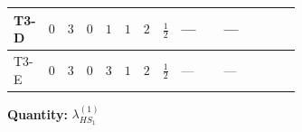 \documentclass[8pt]{article}
\begin{document}
\begin{landscape}
\begin{longtable}{@{}llcccccc >{\raggedright\arraybackslash}p{0.21\linewidth} >{\raggedright\arraybackslash}p{0.21\linewidth} >{\raggedright\arraybackslash}p{0.21\linewidth}@{}}
\midrule
T3-D & $0$ & $3$ & $0$ & $1$ & $1$ & $2$ & $\frac{1}{2}$ & --- & --- & \scriptsize\adjustbox{max width=\linewidth}{$\begin{gathered} {\lambda_{HS_1}^{(1)}} (6 \operatorname{Tr}\!\left({Y_d}\,\left({Y_d}\right)^{\dagger}\right)+2 \operatorname{Tr}\!\left({Y_e}\,\left({Y_e}\right)^{\dagger}\right)+6 \operatorname{Tr}\!\left({Y_u}\,\left({Y_u}\right)^{\dagger}\right)+4 {\lambda_{S_1}^{(A)}})\end{gathered}$} \\
\midrule
T3-E & $0$ & $3$ & $0$ & $3$ & $1$ & $2$ & $\frac{1}{2}$ & --- & --- & \scriptsize\adjustbox{max width=\linewidth}{$\begin{gathered} {\lambda_{HS_1}^{(1)}} (6 \operatorname{Tr}\!\left({Y_d}\,\left({Y_d}\right)^{\dagger}\right)+2 \operatorname{Tr}\!\left({Y_e}\,\left({Y_e}\right)^{\dagger}\right)+6 \operatorname{Tr}\!\left({Y_u}\,\left({Y_u}\right)^{\dagger}\right)+4 {\lambda_{S_1}^{(A)}})\end{gathered}$} \\
\midrule
\bottomrule
\end{longtable}
\clearpage
\noindent\textbf{Quantity: }$\lambda_{HS_1}^{(1)}$\par\smallskip

\end{landscape}
\end{document}
